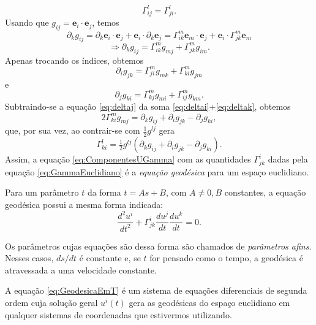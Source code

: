 \begin{equation}\label{eq:GammaSimetria}
\boxed{\Gamma_{i j}^{l}=\Gamma_{j i}^{l}} .
\end{equation}
Usando que $ g_{i j}=\mathbf{e}_{i} \cdot \mathbf{e}_{j} $, temos
\[
\partial_{k} g_{i j}=\partial_{k} \mathbf{e}_{i} \cdot \mathbf{e}_{j}+\mathbf{e}_{i} \cdot \partial_{k} \mathbf{e}_{j}=\Gamma_{i k}^{m} \mathbf{e}_{m} \cdot \mathbf{e}_{j}+\mathbf{e}_{i} \cdot \Gamma_{j k}^{m} \mathbf{e}_{m}
\]
\begin{equation}\label{eq:deltak}
\Rightarrow \partial_{k} g_{i j}=\Gamma_{i k}^{m} g_{m j}+\Gamma_{j k}^{m} g_{i m} .
\end{equation}
Apenas trocando os índices, obtemos
\begin{equation}\label{eq:deltai}
\partial_{i} g_{j k}=\Gamma_{j i}^{m} g_{m k}+\Gamma_{k i}^{m} g_{j m}
\end{equation}
e
\begin{equation}\label{eq:deltaj}
\partial_{j} g_{k i}=\Gamma_{k j}^{m} g_{m i}+\Gamma_{i j}^{m} g_{k m} .
\end{equation}
Subtraindo-se a equação \eqref{eq:deltaj} da soma \eqref{eq:deltai}+\eqref{eq:deltak}, obtemos
\[
	2 \Gamma_{ki}^{m} g_{m j}=\partial_{k} g_{i j}+\partial_{i} g_{j k}-\partial_{j} g_{k i} ,
\]
que, por sua vez, ao contrair-se com $ \tfrac{1}{2} g^{l j} $ gera
\begin{equation}\label{eq:GammaEuclidiano}
\boxed{
	\Gamma_{k i}^{l}=\tfrac{1}{2} g^{l j}\left(\partial_{k} g_{i j}+\partial_{i} g_{j k}-\partial_{j} g_{k i}\right) .
} 
\end{equation}
Assim, a equação \eqref{eq:ComponentesUGamma} com as quantidades $ \Gamma_{jk}^i $ dadas pela equação \eqref{eq:GammaEuclidiano} é a \textit{equação geodésica} para um espaço euclidiano.

Para um parâmetro $ t $ da forma $ t = As+B $, com $ A\neq0,B $ constantes, a equação geodésica possui a mesma forma indicada:
\begin{equation}\label{eq:GeodesicaEmT}
\frac{d^{2} u^{i}}{d t^{2}}+\Gamma_{j k}^{i} \frac{d u^{j}}{d t} \frac{d u^{k}}{d t}=0 .
\end{equation}

Os parâmetros cujas equações são dessa forma são chamados de \textit{parâmetros afins}. Nesses casos, $ ds/dt $ é constante e, se $ t $ for pensado como o tempo, a geodésica é atravessada a uma velocidade constante.

A equação \eqref{eq:GeodesicaEmT} é um sistema de equações diferenciais de segunda ordem cuja solução geral $ u^i(t) $ gera as geodésicas do espaço euclidiano em qualquer sistemas de coordenadas que estivermos utilizando.


